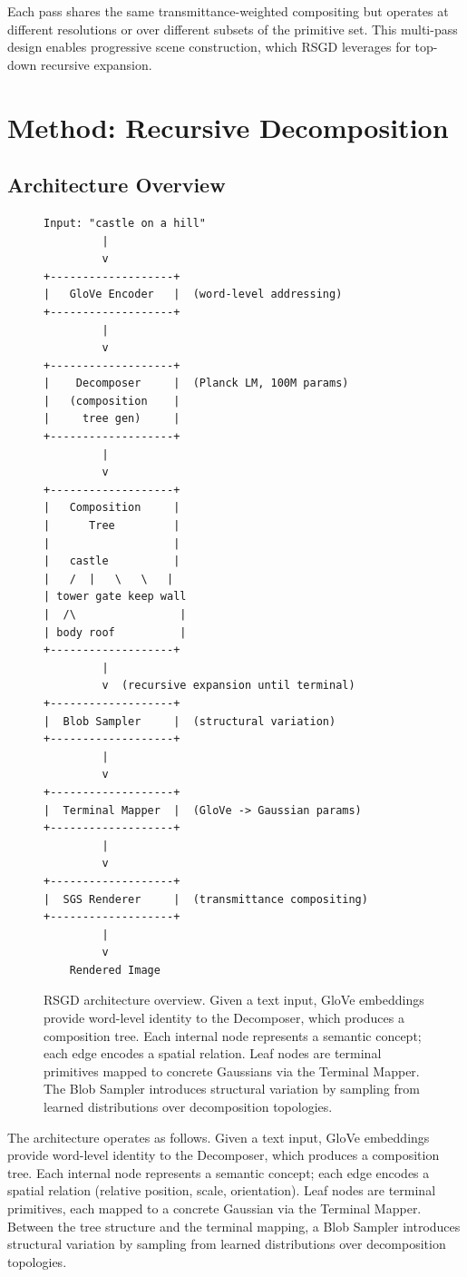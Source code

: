 \documentclass[11pt]{article}
\begin{document}
Each pass shares the same transmittance-weighted compositing but operates at different resolutions or over different subsets of the primitive set. This multi-pass design enables progressive scene construction, which RSGD leverages for top-down recursive expansion.

\section{Method: Recursive Decomposition}

\subsection{Architecture Overview}

\begin{figure}[ht]
\centering
\begin{lstlisting}
Input: "castle on a hill"
         |
         v
+-------------------+
|   GloVe Encoder   |  (word-level addressing)
+-------------------+
         |
         v
+-------------------+
|    Decomposer     |  (Planck LM, 100M params)
|   (composition    |
|     tree gen)     |
+-------------------+
         |
         v
+-------------------+
|   Composition     |
|      Tree         |
|                   |
|   castle          |
|   /  |   \   \   |
| tower gate keep wall
|  /\                |
| body roof          |
+-------------------+
         |
         v  (recursive expansion until terminal)
+-------------------+
|  Blob Sampler     |  (structural variation)
+-------------------+
         |
         v
+-------------------+
|  Terminal Mapper  |  (GloVe -> Gaussian params)
+-------------------+
         |
         v
+-------------------+
|  SGS Renderer     |  (transmittance compositing)
+-------------------+
         |
         v
    Rendered Image
\end{lstlisting}
\caption{RSGD architecture overview. Given a text input, GloVe embeddings provide word-level identity to the Decomposer, which produces a composition tree. Each internal node represents a semantic concept; each edge encodes a spatial relation. Leaf nodes are terminal primitives mapped to concrete Gaussians via the Terminal Mapper. The Blob Sampler introduces structural variation by sampling from learned distributions over decomposition topologies.}
\label{fig:architecture}
\end{figure}

The architecture operates as follows. Given a text input, GloVe embeddings provide word-level identity to the Decomposer, which produces a composition tree. Each internal node represents a semantic concept; each edge encodes a spatial relation (relative position, scale, orientation). Leaf nodes are terminal primitives, each mapped to a concrete Gaussian via the Terminal Mapper. Between the tree structure and the terminal mapping, a Blob Sampler introduces structural variation by sampling from learned distributions over decomposition topologies.
\end{document}
